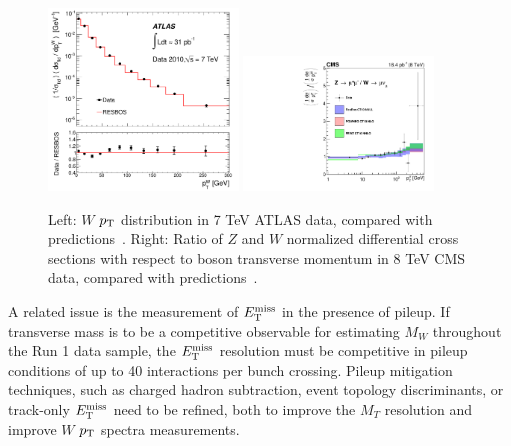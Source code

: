 \begin{figure}[p]
    \centering
    \includegraphics[width=0.45\textwidth]{figures/ss-precision-wmass-wpt-atlas.pdf}
    \includegraphics[width=0.45\textwidth]{figures/ss-precision-wmass-wzptratio-cms.pdf}
    \caption{
    Left: $W$ $p_{\mathrm{T}}$ distribution in 7 TeV ATLAS data, compared with predictions~\cite{Aad:2011fp}.
    Right:  Ratio of $Z$ and $W$ normalized differential cross sections with respect to boson transverse momentum in 8 TeV CMS data, compared with predictions~\cite{Khachatryan:2016nbe}. 
}  
    \label{fig:ss-precision-wmass-wpt}
\end{figure}

A related issue is the measurement of $E_{\mathrm{T}}^{\mathrm{miss}}$ in the presence of
pileup.  If transverse mass is to be a competitive observable for
estimating $M_W$ throughout the Run 1 data sample, the $E_{\mathrm{T}}^{\mathrm{miss}}$
resolution must be competitive in pileup conditions of up to 40
interactions per bunch crossing.  Pileup mitigation techniques, such
as charged hadron subtraction, event topology discriminants, or
track-only $E_{\mathrm{T}}^{\mathrm{miss}}$ need to be refined, both to improve the $M_T$
resolution and improve $W$ $p_{\mathrm{T}}$ spectra measurements.






